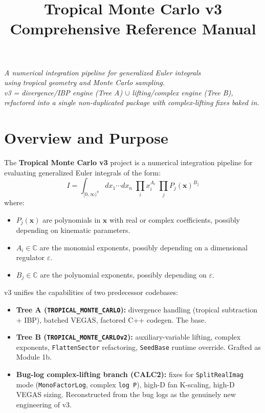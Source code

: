 \documentclass[11pt,a4paper]{article}
\title{\textbf{Tropical Monte Carlo v3} \\ \Large Comprehensive Reference Manual}
\author{}
\date{}
\begin{document}
\maketitle
\thispagestyle{empty}

\vfill
\begin{center}
\textit{A numerical integration pipeline for generalized Euler integrals \\
using tropical geometry and Monte Carlo sampling. \\[0.5em]
v3 = divergence/IBP engine (Tree A) $\cup$ lifting/complex engine (Tree B), \\
refactored into a single non-duplicated package with complex-lifting fixes baked in.}
\end{center}
\vfill

\newpage
\tableofcontents
\newpage

\section{Overview and Purpose}

The \textbf{Tropical Monte Carlo v3} project is a numerical integration pipeline for evaluating generalized Euler integrals of the form:
\begin{equation}\label{eq:main}
I = \int_{[0,\infty)^n} dx_1 \cdots dx_n \;\prod_{i} x_i^{A_i} \;\prod_{j} P_j(\mathbf{x})^{B_j}
\end{equation}
where:
\begin{itemize}
  \item $P_j(\mathbf{x})$ are polynomials in $\mathbf{x}$ with real or complex coefficients, possibly depending on kinematic parameters.
  \item $A_i \in \mathbb{C}$ are the monomial exponents, possibly depending on a dimensional regulator $\varepsilon$.
  \item $B_j \in \mathbb{C}$ are the polynomial exponents, possibly depending on $\varepsilon$.
\end{itemize}

v3 unifies the capabilities of two predecessor codebases:
\begin{itemize}
  \item \textbf{Tree A (\texttt{TROPICAL\_MONTE\_CARLO}):} divergence handling (tropical subtraction + IBP), batched VEGAS, factored C++ codegen. The base.
  \item \textbf{Tree B (\texttt{TROPICAL\_MONTE\_CARLOv2}):} auxiliary-variable lifting, complex exponents, \texttt{FlattenSector} refactoring, \texttt{SeedBase} runtime override. Grafted as Module 1b.
  \item \textbf{Bug-log complex-lifting branch (CALC2):} fixes for \texttt{SplitRealImag} mode (\texttt{MonoFactorLog}, complex \texttt{log P}), high-D fan K-scaling, high-D VEGAS sizing. Reconstructed from the bug logs as the genuinely new engineering of v3.
\end{itemize}
\end{document}
